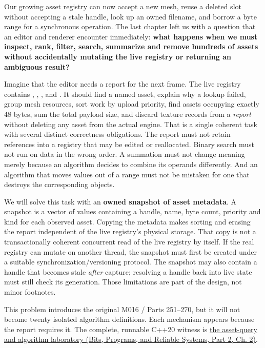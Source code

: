 \hypertarget{01-foundations-i-ch006-from-a-living-asset-registry-to-reliable-queries-and-transformations}{}

Our growing asset registry can now accept a new mesh, reuse a deleted slot without accepting a stale handle, look up an owned filename, and borrow a byte range for a synchronous operation. The last chapter left us with a question that an editor and renderer encounter immediately: \textbf{what happens when we must inspect, rank, filter, search, summarize and remove hundreds of assets without accidentally mutating the live registry or returning an ambiguous result?}

Imagine that the editor needs a report for the next frame. The live registry contains , , ,  and . It should find a named asset, explain why a lookup failed, group mesh resources, sort work by upload priority, find assets occupying exactly 48 bytes, sum the total payload size, and discard texture records from a \emph{report} without deleting any asset from the actual engine. That is a single coherent task with several distinct correctness obligations. The report must not retain references into a registry that may be edited or reallocated. Binary search must not run on data in the wrong order. A summation must not change meaning merely because an algorithm decides to combine its operands differently. And an algorithm that moves values out of a range must not be mistaken for one that destroys the corresponding objects.

We will solve this task with an \textbf{owned snapshot of asset metadata}. A snapshot is a vector of values containing a handle, name, byte count, priority and kind for each observed asset. Copying the metadata makes sorting and erasing the report independent of the live registry's physical storage. That copy is not a transactionally coherent concurrent read of the live registry by itself. If the real registry can mutate on another thread, the snapshot must first be created under a suitable synchronization/versioning protocol. The snapshot may also contain a handle that becomes stale \emph{after} capture; resolving a handle back into live state must still check its generation. Those limitations are part of the design, not minor footnotes.

This problem introduces the original M016 / Parts 251--270, but it will not become twenty isolated algorithm definitions. Each mechanism appears because the report requires it. The complete, runnable C++20 witness is \href{../01-Bits-Programs-and-Reliable-Systems-P02/main.pdf\#nameddest=source-file-c479bd493444d093f6c34898}{the asset-query and algorithm laboratory (Bits, Programs, and Reliable Systems, Part 2, Ch. 2)}.


